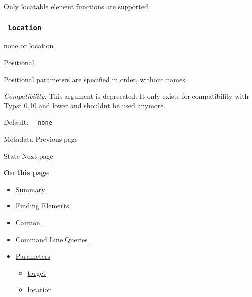 Only
\href{/docs/reference/introspection/location/\#locatable}{locatable}
element functions are supported.

\subsubsection{\texorpdfstring{\texttt{\ location\ }}{ location }}\label{parameters-location}

\href{/docs/reference/foundations/none/}{none} {or}
\href{/docs/reference/introspection/location/}{location}

{{ Positional }}

\label{parameters-location-positional-tooltip}
Positional parameters are specified in order, without names.

\emph{Compatibility:} This argument is deprecated. It only exists for
compatibility with Typst 0.10 and lower and shouldn\textquotesingle t be
used anymore.

Default: \texttt{\ }{\texttt{\ none\ }}\texttt{\ }

\href{/docs/reference/introspection/metadata/}{\pandocbounded{}}

{ Metadata } { Previous page }

\href{/docs/reference/introspection/state/}{\pandocbounded{}}

{ State } { Next page }

\textbf{On this page}

\begin{itemize}
\tightlist
\item
  \hyperref[summary]{Summary}
\item
  \hyperref[finding-elements]{Finding Elements}
\item
  \hyperref[caution]{Caution}
\item
  \hyperref[command-line-queries]{Command Line Queries}
\item
  \hyperref[parameters]{Parameters}

  \begin{itemize}
  \tightlist
  \item
    \hyperref[parameters-target]{target}
  \item
    \hyperref[parameters-location]{location}
  \end{itemize}
\end{itemize}

